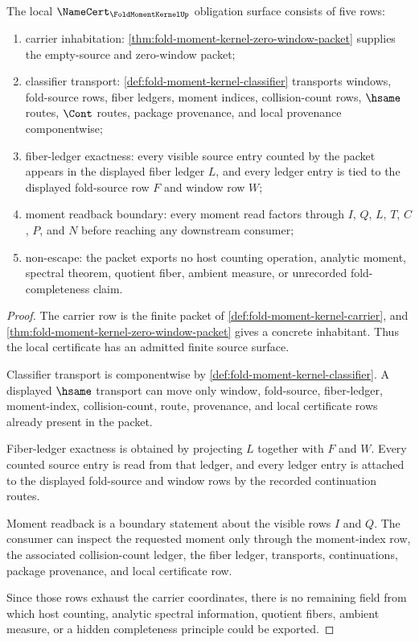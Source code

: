 \begin{theorem}
\label{thm:fold-moment-kernel-namecert-obligation-surface}
The local $\NameCert_{\FoldMomentKernelUp}$ obligation surface consists of five
rows:
\begin{enumerate}
\item carrier inhabitation: \autoref{thm:fold-moment-kernel-zero-window-packet}
supplies the empty-source and zero-window packet;
\item classifier transport: \autoref{def:fold-moment-kernel-classifier}
transports windows, fold-source rows, fiber ledgers, moment indices,
collision-count rows, $\hsame$ routes, $\Cont$ routes, package provenance, and
local provenance componentwise;
\item fiber-ledger exactness: every visible source entry counted by the packet
appears in the displayed fiber ledger $L$, and every ledger entry is tied to the
displayed fold-source row $F$ and window row $W$;
\item moment readback boundary: every moment read factors through $I$, $Q$,
$L$, $T$, $C$, $P$, and $N$ before reaching any downstream consumer;
\item non-escape: the packet exports no host counting operation, analytic
moment, spectral theorem, quotient fiber, ambient measure, or unrecorded
fold-completeness claim.
\end{enumerate}
\end{theorem}
\begin{proof}
The carrier row is the finite packet of
\autoref{def:fold-moment-kernel-carrier}, and
\autoref{thm:fold-moment-kernel-zero-window-packet} gives a concrete
inhabitant. Thus the local certificate has an admitted finite source surface.

Classifier transport is componentwise by
\autoref{def:fold-moment-kernel-classifier}. A displayed $\hsame$ transport can
move only window, fold-source, fiber-ledger, moment-index, collision-count,
route, provenance, and local certificate rows already present in the packet.

Fiber-ledger exactness is obtained by projecting $L$ together with $F$ and $W$.
Every counted source entry is read from that ledger, and every ledger entry is
attached to the displayed fold-source and window rows by the recorded
continuation routes.

Moment readback is a boundary statement about the visible rows $I$ and $Q$.
The consumer can inspect the requested moment only through the moment-index row,
the associated collision-count ledger, the fiber ledger, transports,
continuations, package provenance, and local certificate row.

Since those rows exhaust the carrier coordinates, there is no remaining field
from which host counting, analytic spectral information, quotient fibers,
ambient measure, or a hidden completeness principle could be exported.
\end{proof}

